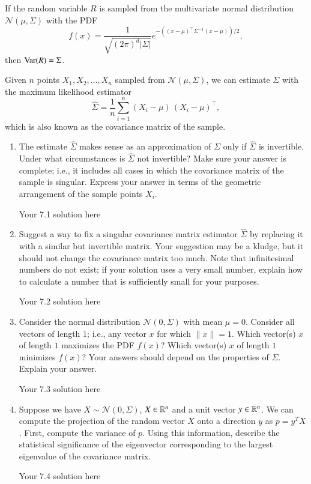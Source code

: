 \documentclass[11pt]{article}
\begin{document}
If the random variable $R$ is sampled from the multivariate normal distribution $\mathcal{N}(\mu, \Sigma)$ with the PDF
\[
f(x) = \frac{1}{\sqrt{(2 \pi)^d |\Sigma|}}e^{- ((x - \mu)^\top \Sigma^{-1} (x- \mu)) / 2},
\]
then $\mathrm{Var}(R) = \Sigma$.

Given $n$ points $X_1, X_2, \ldots, X_n$ sampled from $\mathcal{N}(\mu, \Sigma)$, we can estimate $\Sigma$ with the maximum likelihood estimator
\[
\hat{\Sigma} = \frac{1}{n} \sum_{i = 1}^n (X_i - \mu) \, (X_i - \mu)^\top,
\]
which is also known as the covariance matrix of the sample.

\begin{enumerate}
\item
The estimate $\hat{\Sigma}$ makes sense as an approximation of $\Sigma$ only if $\hat{\Sigma}$ is invertible.  Under what circumstances is $\hat{\Sigma}$ not invertible?  Make sure your answer is complete; i.e., it includes all cases in which the covariance matrix of the sample is singular.  Express your answer in terms of the geometric arrangement of the sample points $X_i$.

\begin{solution}
Your 7.1 solution here
\end{solution}
\item
Suggest a way to fix a singular covariance matrix estimator $\hat{\Sigma}$ by replacing it with a similar but invertible matrix.  Your suggestion may be a kludge, but it should not change the covariance matrix too much.  Note that infinitesimal numbers do not exist; if your solution uses a very small number, explain how to calculate a number that is sufficiently small for your purposes.

\begin{solution}
Your 7.2 solution here
\end{solution}
\item
Consider the normal distribution $\mathcal{N}(0, \Sigma)$ with mean $\mu = 0$.  Consider all vectors of length $1$; i.e., any vector $x$ for which $\|x\| = 1$.  Which vector(s) $x$ of length $1$ maximizes the PDF $f(x)$?  Which vector(s) $x$ of length $1$ minimizes $f(x)$?  Your answers should depend on the properties of $\Sigma$.  Explain your answer.

\begin{solution}
Your 7.3 solution here
\end{solution}
\item
Suppose we have $X \sim \mathcal{N}(0, \Sigma)$, $X \in \mathbb{R}^{n}$ and a unit vector $y \in \mathbb{R}^{n}$. We can compute the projection of the random vector $X$ onto a direction $y$ as $p = y^{T} X$. First, compute the variance of $p$. Using this information, describe the statistical significance of the eigenvector corresponding to the largest eigenvalue of the covariance matrix.

\begin{solution}
Your 7.4 solution here
\end{solution}
\end{enumerate}
\end{document}
